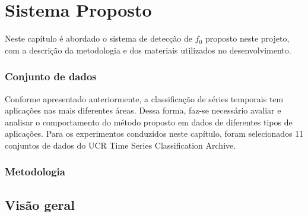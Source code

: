 \chapter{Sistema Proposto} \label{cap3}

Neste capítulo é abordado o sistema de detecção de $f_0$ proposto neste projeto, com a descrição da metodologia e dos materiais utilizados no desenvolvimento.


\subsection{Conjunto de dados}

Conforme apresentado anteriormente, a classificação de séries temporais tem aplicações nas mais diferentes áreas. Dessa forma, faz-se necessário avaliar e analisar o comportamento do método proposto em dados de diferentes tipos de aplicações. Para os experimentos conduzidos neste capítulo, foram selecionados 11 conjuntos de dados do UCR Time Series Classification Archive\cite{UCRArchive}. 

\subsection{Metodologia}


\section{Visão geral}



